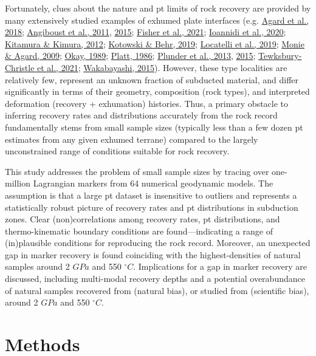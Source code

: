 Fortunately, clues about the nature and \gls{pt} limits of rock recovery are provided by many extensively studied examples of exhumed plate interfaces (e.g. \protect\hyperlink{ref-agard2018}{Agard et al., 2018}; \protect\hyperlink{ref-angiboust2011}{Angiboust et al., 2011}, \protect\hyperlink{ref-angiboust2015}{2015}; \protect\hyperlink{ref-fisher2021}{Fisher et al., 2021}; \protect\hyperlink{ref-ioannidi2020}{Ioannidi et al., 2020}; \protect\hyperlink{ref-kitamura2012}{Kitamura \& Kimura, 2012}; \protect\hyperlink{ref-kotowski2019}{Kotowski \& Behr, 2019}; \protect\hyperlink{ref-locatelli2019}{Locatelli et al., 2019}; \protect\hyperlink{ref-monie2009}{Monie \& Agard, 2009}; \protect\hyperlink{ref-okay1989}{Okay, 1989}; \protect\hyperlink{ref-platt1986}{Platt, 1986}; \protect\hyperlink{ref-plunder2013}{Plunder et al., 2013}, \protect\hyperlink{ref-plunder2015}{2015}; \protect\hyperlink{ref-tewksbury2021a}{Tewksbury-Christle et al., 2021}; \protect\hyperlink{ref-wakabayashi2015}{Wakabayashi, 2015}). However, these type localities are relatively few, represent an unknown fraction of subducted material, and differ significantly in terms of their geometry, composition (rock types), and interpreted deformation (recovery + exhumation) histories. Thus, a primary obstacle to inferring recovery rates and distributions accurately from the rock record fundamentally stems from small sample sizes (typically less than a few dozen \gls{pt} estimates from any given exhumed terrane) compared to the largely unconstrained range of conditions suitable for rock recovery.

This study addresses the problem of small sample sizes by tracing over one-million Lagrangian markers from 64 numerical geodynamic models. The assumption is that a large \gls{pt} dataset is insensitive to outliers and represents a statistically robust picture of recovery rates and \gls{pt} distributions in subduction zones. Clear (non)correlations among recovery rates, \gls{pt} distributions, and thermo-kinematic boundary conditions are found---indicating a range of (in)plausible conditions for reproducing the rock record. Moreover, an unexpected gap in marker recovery is found coinciding with the highest-densities of natural samples around 2 \(GPa\) and 550 \(^\circ C\). Implications for a gap in marker recovery are discussed, including multi-modal recovery depths and a potential overabundance of natural samples recovered from (natural bias), or studied from (scientific bias), around 2 \(GPa\) and 550 \(^\circ C\).

\hypertarget{chpt4Methods}{%
\section{Methods}\label{chpt4Methods}}

